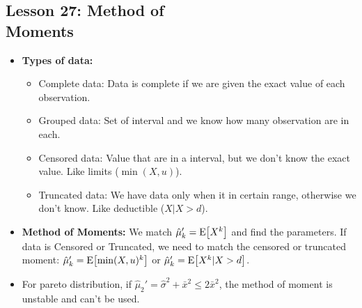 \documentclass[10pt, french]{article}
\begin{document}
\begin{multicols*}{3}
\section*{Lesson 27: Method of \\ Moments}
\begin{itemize}[align=left,leftmargin=*]
\item \textbf{Types of data:}
\begin{itemize}
    \item Complete data: Data is complete if we are given the exact value of each observation.
    \item Grouped data: Set of interval and we know how many observation are in each.
    \item Censored data: Value that are in a interval, but we don't know the exact value. Like limits ($\min(X,u)$).
    \item Truncated data: We have data only when it in certain range, otherwise we don't know. Like deductible ($X|X>d$).
\end{itemize}
\item \textbf{Method of Moments:} We match $\hat{\mu}_k'=\mathrm{E} {\left[ X^k \right]}$ and find the parameters. If data is Censored or Truncated, we need to match the censored or truncated moment: $\hat{\mu}_k'=\mathrm{E} {\left[ \min(X,u)^k \right]}$ or $\hat{\mu}_k'=\mathrm{E} {\left[ X^k|X>d \right]}$.
\item For pareto distribution, if $\hat{\mu}_2'=\hat{\sigma}^2 + \bar{x}^2 \leq 2 \bar{x}^2$, the method of moment is unstable and can't be used.
\end{itemize}


\end{multicols*}
\end{document}
